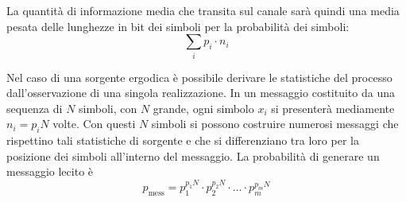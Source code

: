 La quantità di informazione media che transita sul canale sarà quindi una media pesata delle lunghezze in bit dei simboli per la probabilità dei simboli:
\[
	\sum_{i}p_i\cdot n_i
\]

Nel caso di una sorgente ergodica è possibile derivare le statistiche del processo dall'osservazione di una singola realizzazione. In un messaggio costituito da una sequenza di $N$ simboli, con $N$ grande, ogni simbolo $x_i$ si presenterà mediamente $n_i=p_i N$ volte. Con questi $N$ simboli si possono costruire numerosi messaggi che rispettino tali statistiche di sorgente e che si differenziano tra loro per la posizione dei simboli all'interno del messaggio. La probabilità di generare un messaggio lecito è
\begin{equation}
	p_\text{mess}=p_1^{p_1 N}\cdot p_2^{p_2 N}\cdot\dots\cdot p_m^{p_m N}
\end{equation}

